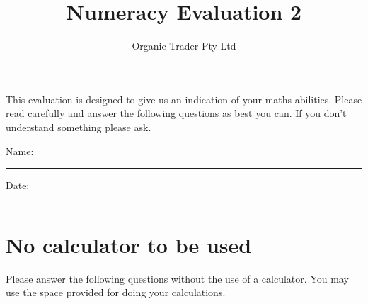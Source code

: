 \documentclass[a4paper]{article}
\begin{document}


\newcommand{\answer}[1]{
  \textcolor{red}{#1}
}
\ifdefined\showanswers
\else
  \renewcommand{\answer}[1]{}
\fi


\title{Numeracy Evaluation 2 \answer{with answers}}
\author{Organic Trader Pty Ltd}

\maketitle
\noindent This evaluation is designed to give us an indication of your
maths abilities. Please read carefully and answer the following questions as best you
can. If you don't understand something please ask.

\hspace{5mm}

\noindent Name: \rule{3cm}{0.2pt}

\hspace{5mm}

\noindent Date: \rule{3cm}{0.2pt}



\section{No calculator to be used}

Please answer the following questions without the use of a calculator. You may use the space provided for doing your calculations.
\end{document}
